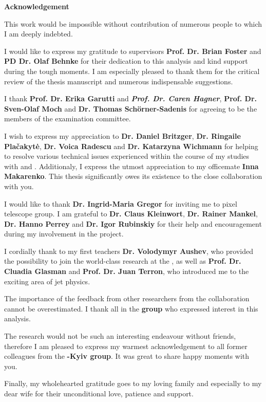 \thispagestyle{empty}
\begin{center}
\huge\textbf{Acknowledgement}
\end{center}

This work would be impossible without contribution of numerous people to which I am deeply indebted. 

I would like to express my gratitude to supervisors \textbf{Prof. Dr. Brian Foster} and \textbf{PD Dr. Olaf Behnke} for their dedication to this analysis and kind support during the tough moments. I am especially pleased to thank them for the critical review of the thesis manuscript and numerous indispensable suggestions. 

I thank \textbf{Prof. Dr. Erika Garutti} and \textbf{\sl{Prof. Dr. Caren Hagner}}, \textbf{Prof. Dr. Sven-Olaf Moch} and  \textbf{Dr. Thomas Sch\"{o}rner-Sadenis} for agreeing to be the members of the examination committee.

I wish to express my appreciation to \textbf{Dr. Daniel Britzger}, \textbf{Dr. Ringaile Pla\v{c}akyt\.{e}}, \textbf{Dr. Voica Radescu} and \textbf{Dr. Katarzyna Wichmann} for helping to resolve various technical issues experienced within the course of my studies with \fastnlo and \herafitter. Additionaly, I express the utmost appreciation to my officemate \textbf{Inna Makarenko}. This thesis significantly owes its existence to the close collaboration with you.

I would like to thank \textbf{Dr. Ingrid-Maria Gregor} for inviting me to \desy pixel telescope group. I am grateful to \textbf{Dr. Claus Kleinwort}, \textbf{Dr. Rainer Mankel}, \textbf{Dr. Hanno Perrey} and \textbf{Dr. Igor Rubinskiy} for their help and encouragement during my involvement in the \eutelescope project.

I cordially thank to my first teachers \textbf{Dr. Volodymyr Aushev}, who provided the possibility to join the world-class research at the \desy, as well as \textbf{Prof. Dr. Cluadia Glasman} and \textbf{Prof. Dr. Juan Terron}, who introduced me to the exciting area of jet physics.

The importance of the feedback from other researchers from the \zeus collaboration cannot be overestimated. I thank all in the \textbf{\zeus group} who expressed interest in this analysis.

The research would not be such an interesting endeavour without friends, therefore I am pleased to express my warmest acknowledgement to all former colleagues from the \textbf{\zeus-Kyiv group}. It was great to share happy moments with you.

Finally, my wholehearted gratitude goes to my loving family and especially to my dear wife for their unconditional love, patience and support.